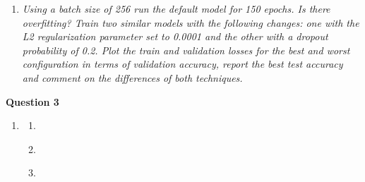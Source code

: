 \documentclass[12pt]{article}
\begin{document}
\begin{enumerate}[leftmargin=\labelsep]
\begin{enumerate}[label=\alph*)]
              \item \textit{Using a batch size of 256 run the default model for 150 epochs. Is there
                        overfitting?
                        Train two similar models with the following changes: one with the L2
                        regularization parameter set to 0.0001 and the other with a dropout probability of 0.2.
                        Plot the train and validation losses for the best and worst configuration in terms of
                        validation accuracy, report the best test accuracy and comment on the differences of
                        both techniques.}
          \end{enumerate}
\end{enumerate}

\center\large{\textbf{Question 3}}

\begin{enumerate}[leftmargin=\labelsep]
    \item \textit{}

          \begin{enumerate}[label=\alph*)]
              \item \textit{}

              \item \textit{}

              \item \textit{}
          \end{enumerate}
\end{enumerate}
\end{document}

